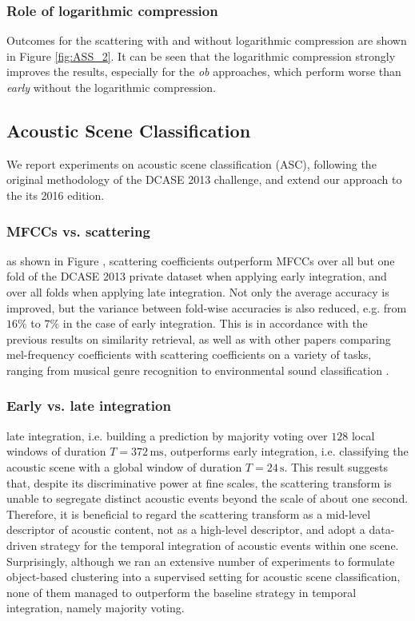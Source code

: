 \documentclass[journal]{IEEEtran}
\makeatletter
\newcommand*{\eg}{e.g.\@\xspace}
\newcommand*{\ie}{i.e.\@\xspace}
\newcommand*{\vs}{vs.\@\xspace}
\makeatother
\begin{document}
\subsubsection*{Role of logarithmic compression}

Outcomes for the scattering with and without logarithmic compression are shown in Figure \ref{fig:ASS_2}. It can be seen that the logarithmic compression strongly improves the results, especially for the \emph{ob} approaches, which perform worse than \emph{early} without the logarithmic compression.

\subsection{Acoustic Scene Classification}
We report experiments on acoustic scene classification (ASC), following the original methodology of the DCASE 2013 challenge, and extend our approach to the its 2016 edition.

\subsubsection*{MFCCs \vs scattering}
as shown in Figure \cite{folds}, scattering coefficients outperform MFCCs over all but one fold of the DCASE 2013 private dataset when applying early integration, and over all folds when applying late integration.
Not only the average accuracy is improved, but the variance between fold-wise accuracies is also reduced, \eg from $16\%$ to $7\%$ in the case of early integration.
This is in accordance with the previous results on similarity retrieval, as well as with other papers comparing mel-frequency coefficients with scattering coefficients on a variety of tasks, ranging from musical genre recognition \cite{Anden2014} to environmental sound classification \cite{Salamon2015}.

\subsubsection*{Early \vs late integration}
late integration, \ie building a prediction by majority voting over $128$ local windows of duration $T=372\,\mathrm{ms}$, outperforms early integration, \ie classifying the acoustic scene with a global window of duration $T=24\,\mathrm{s}$.
This result suggests that, despite its discriminative power at fine scales, the scattering transform is unable to segregate distinct acoustic events beyond the scale of about one second.
Therefore, it is beneficial to regard the scattering transform as a mid-level descriptor of acoustic content, not as a high-level descriptor, and adopt a data-driven strategy for the temporal integration of acoustic events within one scene.
Surprisingly, although we ran an extensive number of experiments to formulate object-based clustering into a supervised setting for acoustic scene classification, none of them managed to outperform the baseline strategy in temporal integration, namely majority voting.
\end{document}
